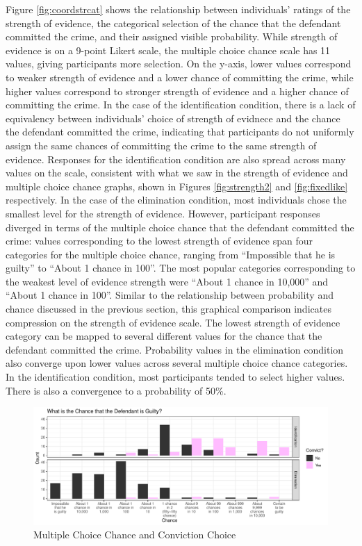 \documentclass[print]{nuthesis}
\begin{document}
Figure \ref{fig:coordstrcat} shows the relationship between individuals' ratings of the strength of evidence, the categorical selection of the chance that the defendant committed the crime, and their assigned visible probability.
While strength of evidence is on a 9-point Likert scale, the multiple choice chance scale has 11 values, giving participants more selection.
On the y-axis, lower values correspond to weaker strength of evidence and a lower chance of committing the crime, while higher values correspond to stronger strength of evidence and a higher chance of committing the crime.
In the case of the identification condition, there is a lack of equivalency between individuals' choice of strength of evidnece and the chance the defendant committed the crime, indicating that participants do not uniformly assign the same chances of committing the crime to the same strength of evidence.
Responses for the identification condition are also spread across many values on the scale, consistent with what we saw in the strength of evidence and multiple choice chance graphs, shown in Figures \ref{fig:strength2} and \ref{fig:fixedlike} respectively.
In the case of the elimination condition, most individuals chose the smallest level for the strength of evidence.
However, participant responses diverged in terms of the multiple choice chance that the defendant committed the crime: values corresponding to the lowest strength of evidence span four categories for the multiple choice chance, ranging from ``Impossible that he is guilty'' to ``About 1 chance in 100''.
The most popular categories corresponding to the weakest level of evidence strength were ``About 1 chance in 10,000'' and ``About 1 chance in 100''.
Similar to the relationship between probability and chance discussed in the previous section, this graphical comparison indicates compression on the strength of evidence scale.
The lowest strength of evidence category can be mapped to several different values for the chance that the defendant committed the crime.
Probability values in the elimination condition also converge upon lower values across several multiple choice chance categories.
In the identification condition, most participants tended to select higher values.
There is also a convergence to a probability of 50\%.

\begin{figure}

{\centering \includegraphics[width=\linewidth]{thesis_files/figure-latex/convictlike-1} 

}

\caption{Multiple Choice Chance and Conviction Choice}\label{fig:convictlike}
\end{figure}
\end{document}
